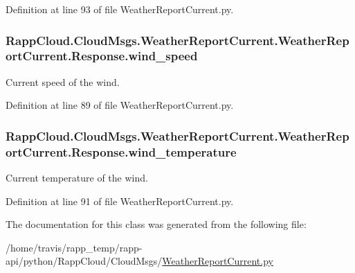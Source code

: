 Definition at line 93 of file Weather\-Report\-Current.\-py.

\hypertarget{classRappCloud_1_1CloudMsgs_1_1WeatherReportCurrent_1_1WeatherReportCurrent_1_1Response_a1d01988ef1a2203a5e11611ea384af8c}{
\subsubsection[{wind\-\_\-speed}]{\setlength{\rightskip}{0pt plus 5cm}Rapp\-Cloud.\-Cloud\-Msgs.\-Weather\-Report\-Current.\-Weather\-Report\-Current.\-Response.\-wind\-\_\-speed}}\label{classRappCloud_1_1CloudMsgs_1_1WeatherReportCurrent_1_1WeatherReportCurrent_1_1Response_a1d01988ef1a2203a5e11611ea384af8c}


Current speed of the wind. 



Definition at line 89 of file Weather\-Report\-Current.\-py.

\hypertarget{classRappCloud_1_1CloudMsgs_1_1WeatherReportCurrent_1_1WeatherReportCurrent_1_1Response_a3d3756623086d21e4c638cbcc9a18c63}{
\subsubsection[{wind\-\_\-temperature}]{\setlength{\rightskip}{0pt plus 5cm}Rapp\-Cloud.\-Cloud\-Msgs.\-Weather\-Report\-Current.\-Weather\-Report\-Current.\-Response.\-wind\-\_\-temperature}}\label{classRappCloud_1_1CloudMsgs_1_1WeatherReportCurrent_1_1WeatherReportCurrent_1_1Response_a3d3756623086d21e4c638cbcc9a18c63}


Current temperature of the wind. 



Definition at line 91 of file Weather\-Report\-Current.\-py.



The documentation for this class was generated from the following file\-:\begin{DoxyCompactItemize}
\item 
/home/travis/rapp\-\_\-temp/rapp-\/api/python/\-Rapp\-Cloud/\-Cloud\-Msgs/\hyperlink{WeatherReportCurrent_8py}{Weather\-Report\-Current.\-py}\end{DoxyCompactItemize}
